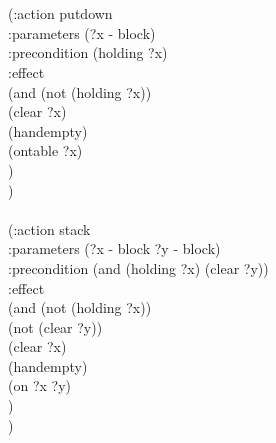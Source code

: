 \begin{appendix}
\\ \hspace*{1.5cm}
\\ \hspace*{1.5cm}  (:action putdown
\\ \hspace*{2cm}	     :parameters (?x - block)
\\ \hspace*{2cm}	     :precondition (holding ?x)
\\ \hspace*{2cm}	     :effect
\\ \hspace*{2cm}	     (and (not (holding ?x))
\\ \hspace*{2.5cm}		   (clear ?x)
\\ \hspace*{2.5cm}		   (handempty)
\\ \hspace*{2.5cm}		   (ontable ?x)
\\ \hspace*{2cm})
\\ \hspace*{1.5cm})
\\ \hspace*{1.5cm}
\\ \hspace*{1.5cm}  (:action stack
\\ \hspace*{2cm}	     :parameters (?x - block ?y - block)
\\ \hspace*{2cm}	     :precondition (and (holding ?x) (clear ?y))
\\ \hspace*{2cm}	     :effect
\\ \hspace*{2cm}	     (and (not (holding ?x))
\\ \hspace*{2.5cm}		   (not (clear ?y))
\\ \hspace*{2.5cm}		   (clear ?x)
\\ \hspace*{2.5cm}		   (handempty)
\\ \hspace*{2.5cm}		   (on ?x ?y)
\\ \hspace*{2cm}	)
\\ \hspace*{1.5cm})

\end{appendix}
